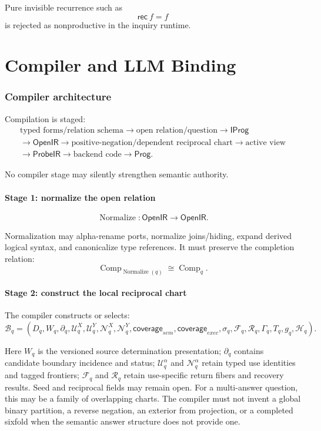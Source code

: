 \documentclass[11pt,oneside]{article}
\newcommand{\Prog}{\mathsf{Prog}}
\newcommand{\OpenIR}{\mathsf{OpenIR}}
\newcommand{\ProbeIR}{\mathsf{ProbeIR}}
\newcommand{\Comp}{\operatorname{Comp}}
\newcommand{\Normalize}{\operatorname{Normalize}}
\begin{document}
Pure invisible recurrence such as
\[
\mathsf{rec}\ f=f
\]
is rejected as nonproductive in the inquiry runtime.

\part{Compiler and LLM Binding}

\section{Compiler architecture}

Compilation is staged:
\[
\boxed{
\begin{gathered}
\text{typed forms/relation schema}\to\text{open relation/question}\to\mathsf{IProg}\\
\to\OpenIR\to\text{positive-negation/dependent reciprocal chart}\to\text{active view}\\
\to\ProbeIR\to\text{backend code}\to\Prog.
\end{gathered}
}
\]

No compiler stage may silently strengthen semantic authority.

\subsection{Stage 1: normalize the open relation}

\[
\Normalize:
\OpenIR\to\OpenIR.
\]

Normalization may alpha-rename ports, normalize joins/hiding, expand derived logical syntax, and canonicalize type references.  It must preserve the completion relation:
\[
\Comp_{\Normalize(q)}\cong\Comp_q.
\]

\subsection{Stage 2: construct the local reciprocal chart}

The compiler constructs or selects:
\[
\boxed{
\mathcal B_q=
(
D_q,
W_q,
\partial_q,
\mathcal U_q^X,
\mathcal U_q^Y,
\mathcal N_q^X,
\mathcal N_q^Y,
\mathsf{coverage}_{sem},
\mathsf{coverage}_{exec},
\sigma_q,
\mathcal F_q,
\mathcal R_q,
\Gamma_q,
T_q,
g_q,
\mathcal H_q
).
}
\]

Here \(W_q\) is the versioned source determination presentation; \(\partial_q\) contains candidate boundary incidence and status; \(\mathcal U_q^\alpha\) and \(\mathcal N_q^\alpha\) retain typed use identities and tagged frontiers; \(\mathcal F_q\) and \(\mathcal R_q\) retain use-specific return fibers and recovery results.  Seed and reciprocal fields may remain open.  For a multi-answer question, this may be a family of overlapping charts.  The compiler must not invent a global binary partition, a reverse negation, an exterior from projection, or a completed sixfold when the semantic answer structure does not provide one.
\end{document}
